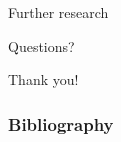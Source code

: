 \documentclass[utf8,t,xcolor=svgnames]{beamer}
\begin{document}
\begin{frame}{Further research}
\end{frame}


\begin{frame}[plain,c]
	
	\begin{center}
		{\Huge Questions?}
	\end{center}
	
	\vfill
	
	\begin{center}
		{\Huge Thank you!}
	\end{center}
	
\end{frame}


\appendix

\begin{frame}[allowframebreaks]
	\frametitle<presentation>{Bibliography}
	\printbibliography
\end{frame}
\end{document}
